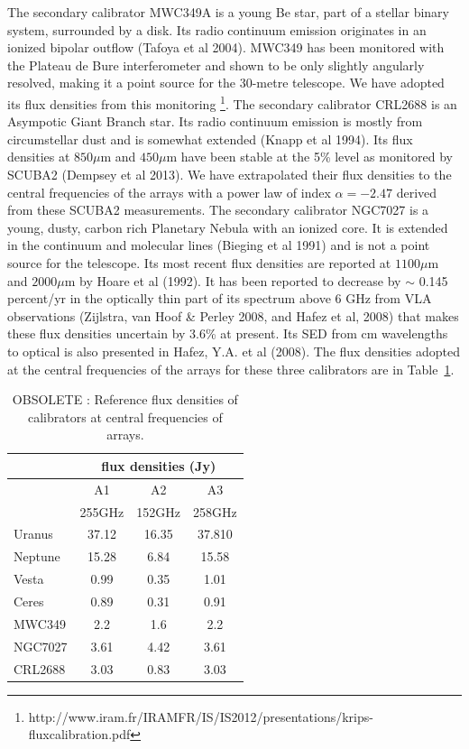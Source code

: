 The secondary calibrator MWC349A is a young Be star, part of a stellar binary system, surrounded by a disk. Its radio
continuum emission originates in an ionized bipolar outflow (Tafoya et al 2004).
MWC349 has been monitored with the  Plateau de Bure interferometer
and shown to be only slightly angularly resolved, making it a point source for the 30-metre telescope. We have adopted
its flux densities from this monitoring \footnote{http://www.iram.fr/IRAMFR/IS/IS2012/presentations/krips-fluxcalibration.pdf}.
The secondary calibrator CRL2688 is an Asympotic Giant Branch star. Its radio continuum emission is mostly from circumstellar dust and
is somewhat extended  (Knapp et al 1994).
Its flux densities at $850\mu$m  and $450\mu$m  have been stable at the 5\% level as monitored by SCUBA2 (Dempsey et al 2013).
We have extrapolated their flux densities to the central frequencies
of the arrays with a power law of index $\alpha=-2.47$ derived from these SCUBA2 measurements.
The secondary calibrator NGC7027 is a young, dusty, carbon rich Planetary Nebula with an ionized core.
It is extended in the continuum and molecular lines (Bieging et al 1991) and  is not a point source for the telescope.
Its  most recent flux densities are reported at $1100\mu$m  and $2000\mu$m by Hoare et al (1992). It has been reported
to decrease by $\sim$ 0.145 percent/yr in the optically thin part of its spectrum above  $6$ GHz from VLA
observations (Zijlstra, van Hoof \& Perley 2008, and Hafez et al, 2008) that makes these flux densities uncertain by 3.6\%
at present. Its SED from cm wavelengths to optical is also presented in Hafez, Y.A. et al (2008).
The flux densities adopted at the central frequencies of the arrays for these three calibrators are in Table~\ref{tab:fluxPred}.


\begin{table}
\centering
\label{tab:fluxPred}
\caption[]{OBSOLETE : Reference flux densities of calibrators at central frequencies of arrays.}
\begin{tabular}{|l|c|c|c|}
\hline
\multicolumn{1}{|c}{}  & \multicolumn{3}{|c|}{flux  densities (Jy)}  \\
\hline
         &    A1      &  A2   &   A3    \\
         &  255GHz    & 152GHz  &  258GHz \\
\hline
Uranus   &  37.12   & 16.35 &  37.810 \\
Neptune  &  15.28   &  6.84 &  15.58  \\
Vesta    &   0.99   &  0.35 &   1.01  \\
Ceres    &   0.89   &  0.31 &   0.91   \\
MWC349   &   2.2    &  1.6  &   2.2   \\
NGC7027  &   3.61   &  4.42 &   3.61  \\
CRL2688  &   3.03   &  0.83 &   3.03  \\
\hline
\end{tabular}
\end{table}

